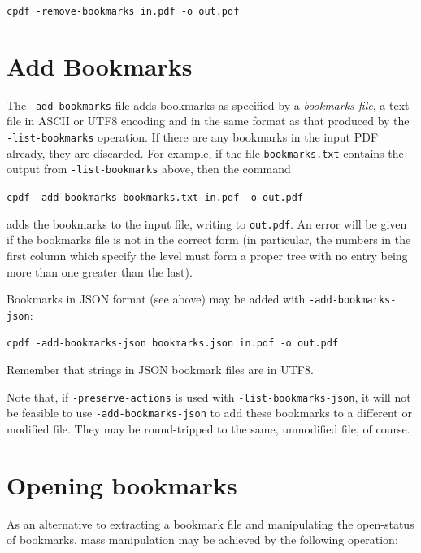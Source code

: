 \documentclass{book}
\begin{document}
  \begin{framed}
    \noindent\small\verb!cpdf -remove-bookmarks in.pdf -o out.pdf!
  \end{framed}

  \section{Add Bookmarks}
  
  The \texttt{-add-bookmarks} file adds bookmarks as specified by a
\textit{bookmarks file}, a text file in ASCII or UTF8 encoding and in the same format as that produced by the
\texttt{-list-bookmarks} operation. If there are any bookmarks in the input PDF
already, they are discarded. For example, if the file \texttt{bookmarks.txt}
contains the output from \texttt{-list-bookmarks} above, then the command

  \begin{framed}
   \noindent\small\verb!cpdf -add-bookmarks bookmarks.txt in.pdf -o out.pdf!
  \end{framed}

\noindent adds the bookmarks to the input file, writing to \texttt{out.pdf}. An error
will be given if the bookmarks file is not in the correct form (in particular,
the numbers in the first column which specify the level must form a proper
tree with no entry being more than one greater than the last).

Bookmarks in JSON format (see above) may be added with \texttt{-add-bookmarks-json}:

  \begin{framed}
   \noindent\small\verb!cpdf -add-bookmarks-json bookmarks.json in.pdf -o out.pdf!
  \end{framed}

\noindent Remember that strings in JSON bookmark files are in UTF8.

Note that, if \texttt{-preserve-actions} is used with \texttt{-list-bookmarks-json}, it will not be feasible to use \texttt{-add-bookmarks-json} to add these bookmarks to a different or modified file. They may be round-tripped to the same, unmodified file, of course.

\section{Opening bookmarks}
As an alternative to extracting a bookmark file and manipulating the open-status of bookmarks, mass manipulation may be achieved by the following operation:
\end{document}
